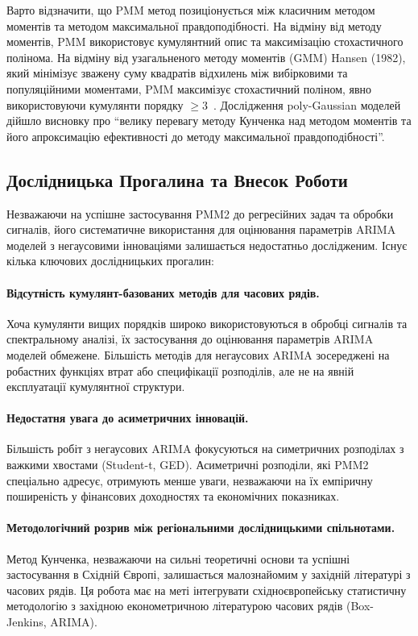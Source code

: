 \documentclass[12pt,a4paper]{article}
\begin{document}
	Варто відзначити, що PMM метод позиціонується між класичним методом моментів та методом максимальної правдоподібності. На відміну від методу моментів, PMM використовує кумулянтний опис та максимізацію стохастичного полінома. На відміну від узагальненого методу моментів (GMM) Hansen (1982), який мінімізує зважену суму квадратів відхилень між вибірковими та популяційними моментами, PMM максимізує стохастичний поліном, явно використовуючи кумулянти порядку $\geq 3$~\cite{chepinoga2014polynomial}. Дослідження poly-Gaussian моделей дійшло висновку про ``велику перевагу методу Кунченка над методом моментів та його апроксимацію ефективності до методу максимальної правдоподібності''.
	
	\subsection{Дослідницька Прогалина та Внесок Роботи}
	\label{subsec:research_gap}
	
	Незважаючи на успішне застосування PMM2 до регресійних задач та обробки сигналів, його систематичне використання для оцінювання параметрів ARIMA моделей з негаусовими інноваціями залишається недостатньо дослідженим. Існує кілька ключових дослідницьких прогалин:
	
	\paragraph{Відсутність кумулянт-базованих методів для часових рядів.} Хоча кумулянти вищих порядків широко використовуються в обробці сигналів та спектральному аналізі, їх застосування до оцінювання параметрів ARIMA моделей обмежене. Більшість методів для негаусових ARIMA зосереджені на робастних функціях втрат або специфікації розподілів, але не на явній експлуатації кумулянтної структури.
	
	\paragraph{Недостатня увага до асиметричних інновацій.} Більшість робіт з негаусових ARIMA фокусуються на симетричних розподілах з важкими хвостами (Student-t, GED). Асиметричні розподіли, які PMM2 спеціально адресує, отримують менше уваги, незважаючи на їх емпіричну поширеність у фінансових доходностях та економічних показниках.
	
	\paragraph{Методологічний розрив між регіональними дослідницькими спільнотами.} Метод Кунченка, незважаючи на сильні теоретичні основи та успішні застосування в Східній Європі, залишається малознайомим у західній літературі з часових рядів. Ця робота має на меті інтегрувати східноєвропейську статистичну методологію з західною економетричною літературою часових рядів (Box-Jenkins, ARIMA).
	
\end{document}
